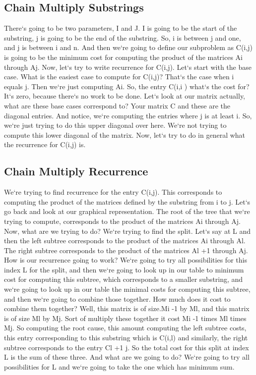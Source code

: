\subsection{Chain Multiply  Substrings}
There`s going to be two parameters, I and J\@.
I is going to be the start of the substring, j is going to be the end of the substring.
So, i is between j and one, and j is between i and n.
And then we`re going to define our subproblem as C(i,j) is going to be the minimum cost for computing the product of the matrices Ai through Aj.
Now, let`s try to write recurrence for C(i,j).
Let`s start with the base case.
What is the easiest case to compute for C(i,j)? That`s the case when i equals j.
Then we`re just computing Ai.
So, the entry C(i,i ) what`s the cost for? It`s zero, because there`s no work to be done.
Let`s look at our matrix actually, what are these base cases correspond to? Your matrix C and these are the diagonal entries.
And notice, we`re computing the entries where j is at least i.
So, we`re just trying to do this upper diagonal over here.
We`re not trying to compute this lower diagonal of the matrix.
Now, let`s try to do in general what the recurrence for C(i,j) is.

\subsection{Chain Multiply  Recurrence}
We`re trying to find recurrence for the entry C(i,j).
This corresponds to computing the product of the matrices defined by the substring from i to j.
Let`s go back and look at our graphical representation.
The root of the tree that we`re trying to compute, corresponds to the product of the matrices Ai through Aj.
Now, what are we trying to do? We`re trying to find the split.
Let`s say at L and then the left subtree corresponds to the product of the matrices Ai through Al.
The right subtree corresponds to the product of the matrices Al +1 through Aj.
How is our recurrence going to work? We`re going to try all possibilities for this index L for the split, and then we`re going to look up in our table to minimum cost for computing this subtree, which corresponds to a smaller substring, and we`re going to look up in our table the minimal costs for computing this subtree, and then we`re going to combine those together.
How much does it cost to combine them together? Well, this matrix is of size.Mi -1 by Ml, and this matrix is of size Ml by Mj.
Sort of multiply these together it cost Mi -1 times Ml times Mj.
So computing the root cause, this amount computing the left subtree costs, this entry corresponding to this substring which is C(i,l) and similarly, the right subtree corresponds to the entry Cl +1 j.
So the total cost for this split at index L is the sum of these three.
And what are we going to do? We`re going to try all possibilities for L and we`re going to take the one which has minimum sum.


